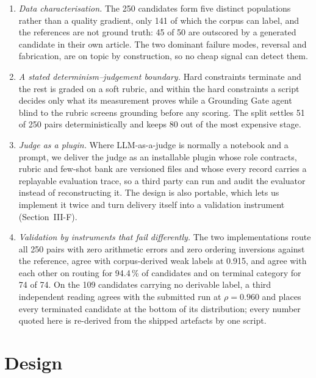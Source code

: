 \documentclass[conference]{IEEEtran}
\begin{document}
\begin{enumerate}
\setlength{\itemsep}{1.5pt}

\item \emph{Data characterisation.} The 250 candidates form five
distinct populations rather than a quality gradient, only 141 of which the
corpus can label, and the references are not ground truth: 45 of 50 are
outscored by a generated candidate in their own article. The two dominant
failure modes, reversal and fabrication, are on topic by construction, so
no cheap signal can detect them.

\item \emph{A stated determinism--judgement boundary.} Hard constraints
terminate and the rest is graded on a soft rubric, and within the hard
constraints a script decides only what its measurement proves while a
Grounding Gate agent blind to the rubric screens grounding before any
scoring. The split settles 51 of 250 pairs deterministically and keeps 80
out of the most expensive stage.

\item \emph{Judge as a plugin.} Where LLM-as-a-judge is normally a
notebook and a prompt, we deliver the judge as an installable plugin
whose role contracts, rubric and few-shot bank are versioned files and
whose every record carries a replayable evaluation trace, so a third
party can run and audit the evaluator instead of reconstructing it. The
design is also portable, which lets us implement it twice and turn
delivery itself into a validation instrument (Section~III-F).

\item \emph{Validation by instruments that fail differently.} The two
implementations route all 250 pairs with zero arithmetic errors and zero
ordering inversions against the reference, agree with corpus-derived weak
labels at 0.915, and agree with each other on routing for 94.4\,\% of
candidates and on terminal category for 74 of 74. On the 109 candidates
carrying no derivable label, a third independent reading agrees with the
submitted run at $\rho = 0.960$ and places every terminated candidate at
the bottom of its distribution; every number quoted here is re-derived
from the shipped artefacts by one script.

\end{enumerate}

\section{Design}
\end{document}
